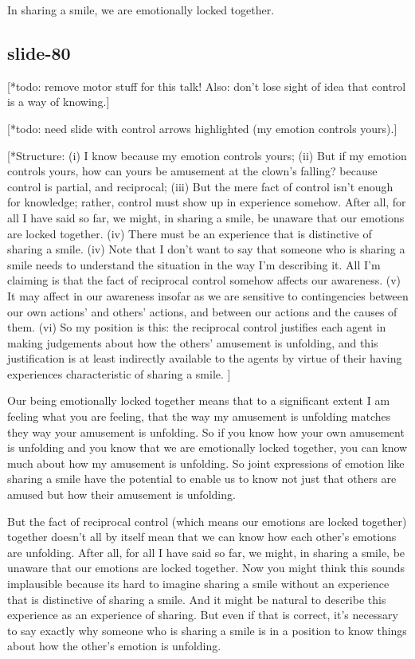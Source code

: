 \documentclass[12pt,\papersize]{extarticle}
\begin{document}
In sharing a smile, we are emotionally locked together.

\subsection{slide-80}
[*todo: remove motor stuff for this talk!  Also: don't lose sight of idea that control is a way of knowing.]

[*todo: need slide with control arrows highlighted (my emotion controls yours).]

[*Structure:
(i) I know because my emotion controls yours;
(ii) But if my emotion controls yours, how can yours be amusement at the clown's falling? because control is partial, and reciprocal;
(iii) But the mere fact of control isn't enough for knowledge; rather, control must show up in experience somehow.
  After all, for all I have said so far, we might, in sharing a smile, be  unaware that our emotions are locked together.
(iv) There must be an experience that is distinctive of sharing a smile.
(iv) Note that I don’t want to say that  someone who is sharing a smile needs to understand the situation in the way I’m describing it.
  All I'm claiming is that the fact of reciprocal control somehow affects our awareness.
(v) It may affect in our awareness insofar as we are sensitive to contingencies between our own actions' and others' actions,
  and between our actions and the causes of them.
(vi) So my position is this: the reciprocal control justifies each agent in making judgements about how the others' amusement is unfolding,
    and this justification is at least indirectly available to the agents by virtue of their having experiences characteristic of sharing a smile.
  ]

Our being emotionally locked together means that
to a significant extent I am feeling what you are feeling,
        that the way my amusement is unfolding matches they way your amusement is unfolding.
So if you know how your own amusement is unfolding and you know that we are emotionally locked together,
you can know much about how my amusement is unfolding.
So joint expressions of emotion like sharing a smile have the potential to enable us to know not just that others are amused but how their amusement is unfolding.

But the fact of reciprocal control (which means our emotions are locked together) together doesn’t all by itself mean that we can know how each other’s emotions are unfolding.
After all, for all I have said so far, we might, in sharing a smile, be  unaware that our emotions are locked together.
Now you might think this sounds implausible because its hard to imagine sharing a smile without an experience that is distinctive of sharing a smile.
And it might be natural to describe this experience as an experience of sharing.
But even if that is correct, it’s necessary to say exactly why someone who is sharing a smile is in a position to know things about how the other’s emotion is unfolding.
\end{document}
